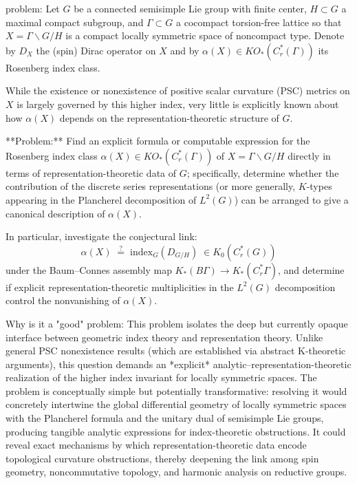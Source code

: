 problem:  
Let \( G \) be a connected semisimple Lie group with finite center, \( H\subset G \) a maximal compact subgroup, and \( \Gamma\subset G \) a cocompact torsion-free lattice so that \( X = \Gamma\backslash G/H \) is a compact locally symmetric space of noncompact type. Denote by \(D_X\) the (spin) Dirac operator on \(X\) and by \(\alpha(X)\in KO_*(C^*_r(\Gamma))\) its Rosenberg index class.  

While the existence or nonexistence of positive scalar curvature (PSC) metrics on \(X\) is largely governed by this higher index, very little is explicitly known about how \(\alpha(X)\) depends on the representation-theoretic structure of \(G\).  

**Problem:**  
Find an explicit formula or computable expression for the Rosenberg index class \(\alpha(X)\in KO_*(C^*_r(\Gamma))\) of \(X=\Gamma\backslash G/H\) directly in terms of representation-theoretic data of \(G\); specifically, determine whether the contribution of the discrete series representations (or more generally, \(K\)-types appearing in the Plancherel decomposition of \(L^2(G)\)) can be arranged to give a canonical description of \(\alpha(X)\).  

In particular, investigate the conjectural link:  
\[
\alpha(X)\;\stackrel{?}{=}\;\mathrm{index}_G(D_{G/H})\;\in K_0(C_r^*(G))
\]
under the Baum–Connes assembly map \(K_*(B\Gamma)\to K_*(C_r^*\Gamma)\), and determine if explicit representation-theoretic multiplicities in the \(L^2(G)\) decomposition control the nonvanishing of \(\alpha(X)\).  

Why is it a "good" problem:  
This problem isolates the deep but currently opaque interface between geometric index theory and representation theory. Unlike general PSC nonexistence results (which are established via abstract K-theoretic arguments), this question demands an *explicit* analytic–representation-theoretic realization of the higher index invariant for locally symmetric spaces. The problem is conceptually simple but potentially transformative: resolving it would concretely intertwine the global differential geometry of locally symmetric spaces with the Plancherel formula and the unitary dual of semisimple Lie groups, producing tangible analytic expressions for index-theoretic obstructions. It could reveal exact mechanisms by which representation-theoretic data encode topological curvature obstructions, thereby deepening the link among spin geometry, noncommutative topology, and harmonic analysis on reductive groups.
